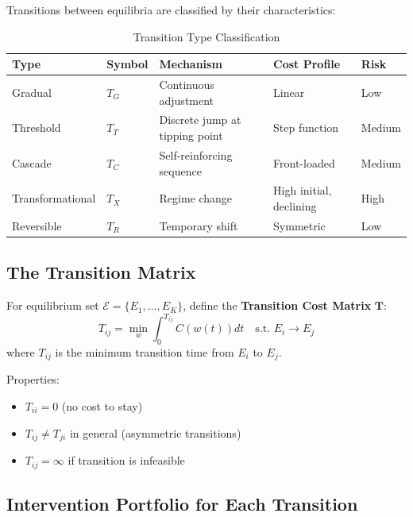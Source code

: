 \begin{definition}
Transitions between equilibria are classified by their characteristics:

\begin{table}[H]
\centering
\caption{Transition Type Classification}
\label{tab:meq-transitions}
\renewcommand{\arraystretch}{1.4}
\begin{tabular}{@{}lllll@{}}
\toprule
\textbf{Type} & \textbf{Symbol} & \textbf{Mechanism} & \textbf{Cost Profile} & \textbf{Risk} \\
\midrule
Gradual & $T_G$ & Continuous adjustment & Linear & Low \\
Threshold & $T_T$ & Discrete jump at tipping point & Step function & Medium \\
Cascade & $T_C$ & Self-reinforcing sequence & Front-loaded & Medium \\
Transformational & $T_X$ & Regime change & High initial, declining & High \\
Reversible & $T_R$ & Temporary shift & Symmetric & Low \\
\bottomrule
\end{tabular}
\end{table}
\end{definition}

\subsection{The Transition Matrix}

\begin{definition}
For equilibrium set $\mathcal{E} = \{E_1, ..., E_K\}$, define the
\textbf{Transition Cost Matrix} $\mathbf{T}$:
\begin{equation}
T_{ij} = \min_{w} \int_0^{T_{ij}} C(w(t)) dt \quad \text{s.t. } E_i \to E_j
\end{equation}
where $T_{ij}$ is the minimum transition time from $E_i$ to $E_j$.

Properties:
\begin{itemize}[nosep]
    \item $T_{ii} = 0$ (no cost to stay)
    \item $T_{ij} \neq T_{ji}$ in general (asymmetric transitions)
    \item $T_{ij} = \infty$ if transition is infeasible
\end{itemize}
\end{definition}

\subsection{Intervention Portfolio for Each Transition}

